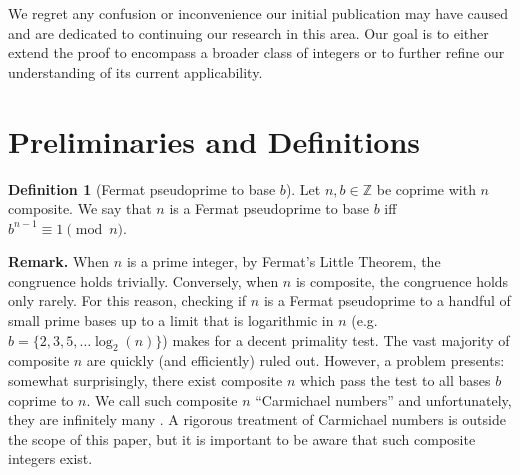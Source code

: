 \documentclass{article}
\theoremstyle{plain}
\theoremstyle{definition}
\newtheorem{definition}{Definition}
\begin{document}
We regret any confusion or inconvenience our initial publication may have caused and are dedicated to continuing our research in this area. Our goal is to either extend the proof to encompass a broader class of integers or to further refine our understanding of its current applicability.

\section{Preliminaries and Definitions}

\begin{definition}[Fermat pseudoprime to base $b$] \label{definition:fermatpsp}
Let $n,b \in \mathbb{Z}$ be coprime with $n$ composite. We say that $n$ is a Fermat pseudoprime to base $b$ iff $b^{n-1} \equiv 1 \pmod{n}$.

\textbf{Remark.}
When $n$ is a prime integer, by Fermat's Little Theorem, the congruence holds trivially. Conversely, when $n$ is composite, the congruence holds only rarely. For this reason, checking if $n$ is a Fermat pseudoprime to a handful of small prime bases up to a limit that is logarithmic in $n$ (e.g. $b = \{ 2, 3, 5, \ldots \log_2(n) \}$) makes for a decent primality test. The vast majority of composite $n$ are quickly (and efficiently) ruled out. However, a problem presents: somewhat surprisingly, there exist composite $n$ which pass the test to all bases $b$ coprime to $n$. We call such composite $n$ ``Carmichael numbers'' \cite{crandallpomerance2005carmichaelnumbers} and unfortunately, they are infinitely many \cite{alfordgranvillepomerance1994carmichaelnumbers}. A rigorous treatment of Carmichael numbers is outside the scope of this paper, but it is important to be aware that such composite integers exist.
\end{definition}
\end{document}
